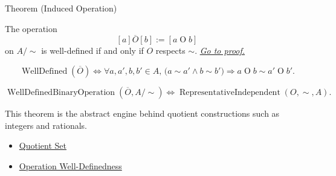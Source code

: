 \begin{theorembox}{Theorem (Induced Operation)}
\begin{theorem}
\label{thm:induced-operation-well-defined}
The operation
\[
[a]\mathbin{\overline{O}}[b]:=[a\mathbin{O}b]
\]
on $A/{\sim}$ is well-defined if and only if $O$ respects $\sim$.
\hyperref[prf:induced-operation-well-defined]{\textit{Go to proof.}}
\end{theorem}
\end{theorembox}

\begin{remark*}
\[
\operatorname{WellDefined}(\overline{O})
\Longleftrightarrow
\forall a,a',b,b'\in A,\,
\bigl(a\sim a'\land b\sim b'\bigr)
\Rightarrow
a\mathbin{O}b\sim a'\mathbin{O}b'.
\]
\end{remark*}

\begin{remark*}
\[
\operatorname{WellDefinedBinaryOperation}(\overline{O},A/{\sim})
\Longleftrightarrow
\operatorname{RepresentativeIndependent}(O,\sim,A).
\]
\end{remark*}

\begin{remark*}[Interpretation]
This theorem is the abstract engine behind quotient constructions such as
integers and rationals.
\end{remark*}

\begin{dependencies}
\begin{itemize}
  \item \hyperref[def:quotient-set]{Quotient Set}
  \item \hyperref[def:operation-well-definedness]{Operation Well-Definedness}
\end{itemize}
\end{dependencies}
